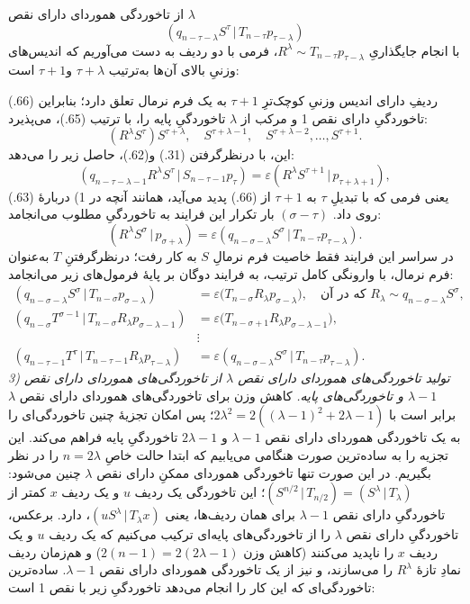 \documentclass[11pt]{article}
\providecommand{\srcnumdisplay}[3][3.4em]{%
  \par\smallskip\noindent
  \babelsublr{\begin{minipage}[t]{#1}\vspace*{0pt}\srcLTR{#2}\end{minipage}%
  \begin{minipage}[t]{\dimexpr\linewidth-#1\relax}\vspace*{0pt}\centering
  \(\displaystyle #3\)\end{minipage}}\par\smallskip}
\newcommand{\srcLTR}[1]{\relax\ifmmode\text{\mbox{\babelsublr{\foreignlanguage{english}{#1}}}}\else\babelsublr{\foreignlanguage{english}{#1}}\fi}
\providecommand{\pair}[2]{(#1\,|\,#2)}
\providecommand{\eps}{\varepsilon}
\begin{document}
از تاخوردگی هموردای دارای نقص $\lambda$
\[
 \pair{q_{n-\tau-\lambda}S^\tau}{T_{n-\tau}p_{\tau-\lambda}}
\]
با انجام جایگذاریِ $R^\lambda\sim T_{n-\tau}p_{\tau-\lambda}$، فرمی با دو ردیف به دست می‌آوریم که اندیس‌های وزنیِ بالای آن‌ها به‌ترتیب $\tau+\lambda$ و$\tau+1$ است:
\srcnumdisplay[4.2em]{(66.)}{%
 \pair{R^\lambda S^\tau}{p_{\tau+\lambda}}\pair{S^{\tau+1}}{p_{\tau+1}}.}
ردیفِ دارای اندیس وزنیِ کوچک‌ترِ $\tau+1$ به یک فرم نرمال تعلق دارد؛ بنابراین (66.) تاخوردگیِ دارای نقص 1 و مرکب از $\lambda$ تاخوردگیِ پایه را، با ترتیب (65.)، می‌پذیرد:
\[
 (R^\lambda S^\tau)S^{\tau+\lambda},\quad S^{\tau+\lambda-1},\quad S^{\tau+\lambda-2},\ldots,S^{\tau+1}.
\]
این، با درنظرگرفتن (31.) و(62.)، حاصل زیر را می‌دهد:
\[
 \pair{q_{n-\tau-\lambda-1}R^\lambda S^\tau}{S_{n-\tau-1}p_\tau}=\eps\pair{R^\lambda S^{\tau+1}}{p_{\tau+\lambda+1}},
\]
یعنی فرمی که با تبدیلِ $\tau$ به $\tau+1$ از (66.) پدید می‌آید، همانند آنچه در 1) دربارهٔ (63.) روی داد. $(\sigma-\tau)$ بار تکرار این فرایند به تاخوردگیِ مطلوب می‌انجامد:
\[
 \pair{R^\lambda S^\sigma}{p_{\sigma+\lambda}}=\eps\pair{q_{n-\sigma-\lambda}S^\sigma}{T_{n-\tau}p_{\tau-\lambda}}.
\]
در سراسر این فرایند فقط خاصیت فرم نرمالِ $S$ به کار رفت؛ درنظرگرفتنِ $T$ به‌عنوان فرم نرمال، با وارونگی کامل ترتیب، به فرایند دوگان بر پایهٔ فرمول‌های زیر می‌انجامد:
\begin{align*}
\pair{q_{n-\sigma-\lambda}S^\sigma}{T_{n-\sigma}p_{\sigma-\lambda}}&=\eps\bigl(T_{n-\sigma}R_\lambda p_{\sigma-\lambda}\bigr),\quad \text{که در آن }R_\lambda\sim q_{n-\sigma-\lambda}S^\sigma,\\
\pair{q_{n-\sigma}T^{\sigma-1}}{T_{n-\sigma}R_\lambda p_{\sigma-\lambda-1}}&=\eps\bigl(T_{n-\sigma+1}R_\lambda p_{\sigma-\lambda-1}\bigr),\\
&\vdots\\
\pair{q_{n-\tau-1}T^\tau}{T_{n-\tau-1}R_\lambda p_{\tau-\lambda}}&=\eps\pair{q_{n-\sigma-\lambda}S^\sigma}{T_{n-\tau}p_{\tau-\lambda}}.
\end{align*}
\emph{3) تولید تاخوردگی‌های هموردای دارای نقص $\lambda$ از تاخوردگی‌های هموردای دارای نقص $\lambda-1$ و تاخوردگی‌های پایه.} کاهش وزن برای تاخوردگی‌های هموردای دارای نقص $\lambda$ برابر است با $2\lambda^2=2((\lambda-1)^2+2\lambda-1)$؛ پس امکان تجزیهٔ چنین تاخوردگی‌ای را به یک تاخوردگی هموردای دارای نقص $\lambda-1$ و $2\lambda-1$ تاخوردگیِ پایه فراهم می‌کند. این تجزیه را به ساده‌ترین صورت هنگامی می‌یابیم که ابتدا حالت خاصِ $n=2\lambda$ را در نظر بگیریم. در این صورت تنها تاخوردگی هموردای ممکنِ دارای نقص $\lambda$ چنین می‌شود: $\pair{S^{n/2}}{T_{n/2}}=\pair{S^\lambda}{T_\lambda}$؛ این تاخوردگی یک ردیف $u$ و یک ردیف $x$ کمتر از تاخوردگیِ دارای نقص $\lambda-1$ برای همان ردیف‌ها، یعنی $\pair{uS^\lambda}{T_\lambda x}$، دارد. برعکس، تاخوردگیِ دارای نقص $\lambda$ را از تاخوردگی‌های پایه‌ای ترکیب می‌کنیم که یک ردیف $u$ و یک ردیف $x$ را ناپدید می‌کنند (کاهش وزن $2(n-1)=2(2\lambda-1)$) و هم‌زمان ردیف نمادِ تازهٔ $R^\lambda$ را می‌سازند، و نیز از یک تاخوردگی هموردای دارای نقص $\lambda-1$. ساده‌ترین تاخوردگی‌ای که این کار را انجام می‌دهد تاخوردگیِ زیر با نقص 1 است:
\end{document}
